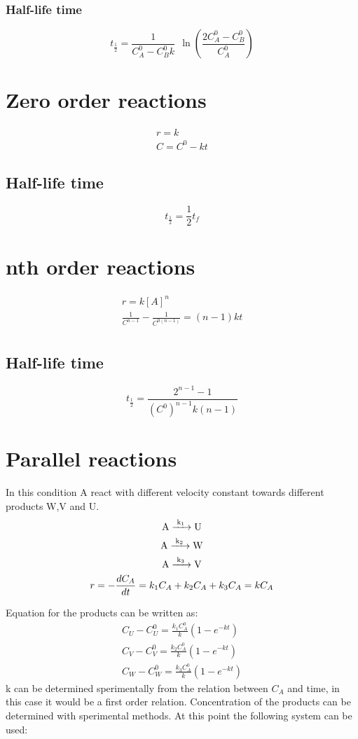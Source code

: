 \documentclass[Master.tex]{subfiles}
\begin{document}
\begin{multicols}{2}
				   \subsubsection{Half-life time}
						    \[
								     t_{\frac{1}{2}} = \frac{1}{C_{A} ^{0} - C_{B} ^{0} k}~ ~  \ln\left(  \frac{2C_{A} ^{0} - C_{B}^{0} }{C_{A}^{0}} \right)
						    \]

		 \section{Zero order reactions}
		  \begin{gather*}
				   r = k\\
				   C = C^0 - kt
		  \end{gather*}
		  \subsection{Half-life time}
				   \[
						    t_{\frac{1}{2}}  = \frac{1}{2}t_{f}
				   \]
		 \section{nth order reactions}
		  \begin{gather*}
				   r = k[A]^{n} \\
				   \frac{1}{C^{n-1} } - \frac{1}{C^{0(n-1 )} } = (n-1)kt\\
		  \end{gather*}
		  \subsection{Half-life time}
				   \[
						    t_{\frac{1}{2}} = \frac{2^{n-1} -1 }{(C^{0} )^{n-1} k(n-1)}
				   \]

		 \section{Parallel reactions}
		  In this condition A react with different velocity constant towards different
		  products W,V and U.
		  \begin{gather*}
				   \ce{ A ->[{k_{1}}] U} \\
				   \ce{ A ->[{k_{2}}] W} \\
				   \ce{ A ->[{k_{3}}] V} \\
				   r =  - \frac{dC_{A} }{dt} = k_{1}C_{A} + k_{2}C_{A} + k_{3}C_{A} = kC_{A}
		  \end{gather*}

		  Equation for the products can be written as:
		  \begin{gather*}
				   C_{U} - C_{U}^{0} = \frac{k_{1}C_{A}^{0}}{k}(1-e^{-kt})\\
				   C_{V} - C_{V}^{0} = \frac{k_{2}C_{A}^{0}}{k}(1-e^{-kt})\\
				   C_{W} - C_{W}^{0} = \frac{k_{3}C_{A}^{0}}{k}(1-e^{-kt})
		  \end{gather*}
		  k can be determined sperimentally from the relation between \( C_{A}  \) and time, in this case it would be a first order relation.
		  Concentration of the products can be determined with sperimental methods. At this point the following system can be used:


\end{multicols}
\end{document}
